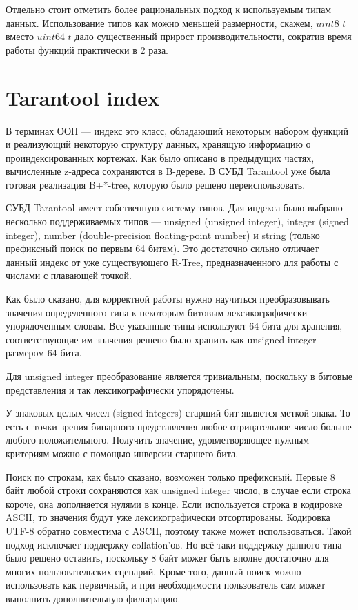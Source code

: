 Отдельно стоит отметить более рациональных подход к используемым типам данных.
Использование типов как можно меньшей размерности, скажем,
$uint8\_t$ вместо $uint64\_t$ дало существенный прирост производительности, сократив время работы функций практически в 2 раза.

\section{Tarantool index}
В терминах ООП --- индекс это класс, обладающий некоторым набором функций и реализующий некоторую структуру данных, хранящую информацию о проиндексированных кортежах.
Как было описано в предыдущих частях, вычисленные z-адреса сохраняются в B-дереве. В СУБД Tarantool уже была готовая реализация B+*-tree, которую было решено переиспользовать.

СУБД Tarantool имеет собственную систему типов. Для индекса было выбрано несколько поддерживаемых типов --- unsigned (unsigned integer), integer (signed integer), number (double-precision floating-point number) и string (только префиксный поиск по первым 64 битам). Это достаточно сильно отличает данный индекс от уже существующего R-Tree, предназначенного для работы с числами с плавающей точкой.

Как было сказано, для корректной работы нужно научиться преобразовывать значения определенного типа к некоторым битовым лексикографически упорядоченным словам. Все указанные типы используют 64 бита для хранения, соответствующие им значения решено было хранить как unsigned integer размером 64 бита. 

Для unsigned integer преобразование является тривиальным, поскольку в битовые представления и так лексикографически упорядочены. 

У знаковых целых чисел (signed integers) старший бит является меткой знака. То есть с точки зрения бинарного представления любое отрицательное число больше любого положительного. Получить значение, удовлетворяющее нужным критериям можно с помощью инверсии старшего бита.

Поиск по строкам, как было сказано, возможен только префиксный. Первые 8 байт любой строки сохраняются как unsigned integer число, в случае если строка короче, она дополняется нулями в конце. Если используется строка в кодировке ASCII, то значения будут уже лексикографически отсортированы. Кодировка UTF-8 обратно совместима с ASCII, поэтому также может использоваться. Такой подход исключает поддержку collation’ов. Но всё-таки поддержку данного типа было решено оставить, поскольку 8 байт может быть вполне достаточно для многих пользовательских сценарий. Кроме того, данный поиск можно использовать как первичный, и при необходимости пользователь сам может выполнить дополнительную фильтрацию.

